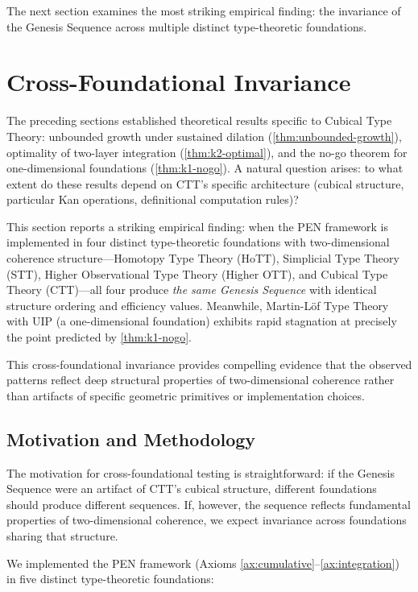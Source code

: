 \documentclass[11pt]{article}
\theoremstyle{definition}
\theoremstyle{remark}
\begin{document}
The next section examines the most striking empirical finding: the invariance of the Genesis Sequence across multiple distinct type-theoretic foundations.

\section{Cross-Foundational Invariance}
\label{sec:cross-foundational}

The preceding sections established theoretical results specific to Cubical Type Theory: unbounded growth under sustained dilation (\cref{thm:unbounded-growth}), optimality of two-layer integration (\cref{thm:k2-optimal}), and the no-go theorem for one-dimensional foundations (\cref{thm:k1-nogo}). A natural question arises: to what extent do these results depend on CTT's specific architecture (cubical structure, particular Kan operations, definitional computation rules)?

This section reports a striking empirical finding: when the PEN framework is implemented in four distinct type-theoretic foundations with two-dimensional coherence structure---Homotopy Type Theory (HoTT), Simplicial Type Theory (STT), Higher Observational Type Theory (Higher OTT), and Cubical Type Theory (CTT)---all four produce \emph{the same Genesis Sequence} with identical structure ordering and efficiency values. Meanwhile, Martin-Löf Type Theory with UIP (a one-dimensional foundation) exhibits rapid stagnation at precisely the point predicted by \cref{thm:k1-nogo}.

This cross-foundational invariance provides compelling evidence that the observed patterns reflect deep structural properties of two-dimensional coherence rather than artifacts of specific geometric primitives or implementation choices.

\subsection{Motivation and Methodology}

The motivation for cross-foundational testing is straightforward: if the Genesis Sequence were an artifact of CTT's cubical structure, different foundations should produce different sequences. If, however, the sequence reflects fundamental properties of two-dimensional coherence, we expect invariance across foundations sharing that structure.

We implemented the PEN framework (Axioms \ref{ax:cumulative}--\ref{ax:integration}) in five distinct type-theoretic foundations:
\end{document}
